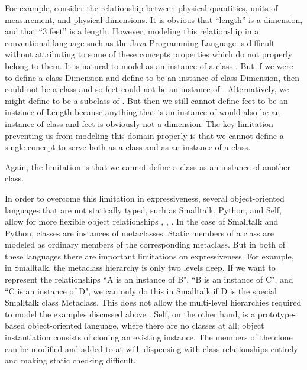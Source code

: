 \documentclass{acm-sigplan}
\begin{document}
For example, consider the relationship between
physical quantities, units of measurement, and physical dimensions. It
is obvious that ``length'' is a dimension, and that ``3 feet'' is a
length.  However, modeling this relationship in a conventional
language such as the Java Programming Language is difficult without
attributing to some of these concepts properties which do not properly
belong to them.  It is natural to model {} as an instance
of a class {}. But if we were to define a class {\txt
Dimension} and define {} to be an instance of class {\txt
Dimension}, then {} could not be a class and so {
feet} could not be an instance of {}. Alternatively, we
might define {} to be a subclass of {}. But
then we still cannot define { feet} to be an instance of {\txt
Length} because anything that is an instance of {} would
also be an instance of class {} and { feet} is
obviously not a dimension. The key limitation preventing us from
modeling this domain properly is that we cannot define a single
concept to serve both as a class and as an instance of a class.

Again, the limitation is that we cannot define a class as an instance of another class.

In order to overcome this limitation in expressiveness, several
object-oriented languages that are not statically typed, such as
Smalltalk, Python, and Self, allow for more flexible object
relationships \cite{Smalltalk80}, \cite{ArtMOP}, \cite{PythonMeta}. In
the case of Smalltalk and Python, classes are instances of
metaclasses. Static members of a class are modeled as ordinary members
of the corresponding metaclass.  But in both of these languages there
are important limitations on expressiveness.  For example, in
Smalltalk, the metaclass hierarchy is only two levels deep.  If we
want to represent the relationships ``{\txt A} is an instance of {\txt
B}", ``{\txt B} is an instance of {\txt C}", and ``{\txt C} is an
instance of {\txt D}", we can only do this in Smalltalk if {\txt D} is
the special Smalltalk class {\txt Metaclass}.  This does not allow the
multi-level hierarchies required to model the examples discussed above
\cite{Smalltalk80}.  Self, on the other hand, is a prototype-based
object-oriented language, where there are no classes at all; object
instantiation consists of cloning an existing instance. The members of
the clone can be modified and added to at will, dispensing with class
relationships entirely and making static checking difficult.
\end{document}
